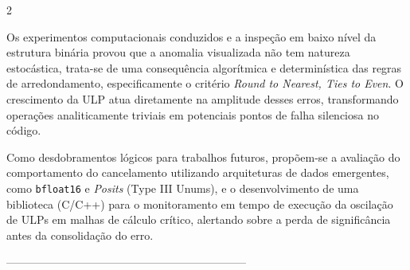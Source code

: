 \documentclass[a0,portrait]{a0poster}
\begin{document}
\begin{multicols}{2}
  \color{Black}
  \vspace{-2.5cm}
  \begin{justify}\setlength{\parindent}{5ex} \indent \par
    Os experimentos computacionais conduzidos e a inspeção em baixo nível da
    estrutura binária provou que a anomalia visualizada não tem natureza
    estocástica, trata-se de uma consequência algorítmica e determinística das
    regras de arredondamento, especificamente o critério \textit{Round to Nearest,
      Ties to Even}. O crescimento da ULP atua diretamente na amplitude desses erros,
    transformando operações analiticamente triviais em potenciais pontos de falha
    silenciosa no código.

    Como desdobramentos lógicos para trabalhos futuros, propõem-se a avaliação do
    comportamento do cancelamento utilizando arquiteturas de dados emergentes, como
    \texttt{bfloat16} e \textit{Posits} (Type III Unums), e o desenvolvimento de
    uma biblioteca (C/C++) para o monitoramento em tempo de execução da oscilação
    de ULPs em malhas de cálculo crítico, alertando sobre a perda de significância
    antes da consolidação do erro.
  \end{justify}
  \vspace{-.5cm}
  \color{DarkSlateGray}-----------------------------------------------------------------
  \vspace{-2cm}
  \nocite{*} %
  
  
  \vspace{-3cm}


\end{multicols}
\end{document}
